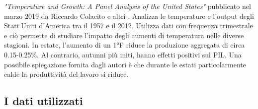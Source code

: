 \textit{"Temperature and Growth: A Panel Analysis of the United States"} pubblicato nel marzo 2019 da Riccardo Colacito e altri \parencite{Colacito:temp}. Analizza le temperature e l'output degli Stati Uniti d'America tra il 1957 e il 2012. Utilizza dati con frequenza trimestrale e ciò permette di studiare l'impatto degli aumenti di temperatura nelle diverse stagioni. In estate, l'aumento di un 1°F riduce la produzione aggregata di circa 0.15-0.25\%. Al contrario, autunni più miti, hanno effetti positivi sul PIL. Una possibile spiegazione fornita dagli autori è che durante le estati particolarmente calde la produttività del lavoro si riduce.

\subsection{I dati utilizzati}


